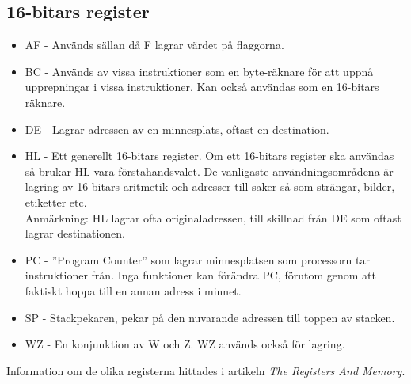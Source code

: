 \documentclass{article}
\begin{document}
\subsection{16-bitars register}
\begin{itemize}
    \item AF - Används sällan då F lagrar värdet på flaggorna.
    \item BC - Används av vissa instruktioner som en byte-räknare för att uppnå
    upprepningar i vissa instruktioner. Kan också användas som en 16-bitars
    räknare.
    \item DE - Lagrar adressen av en minnesplats, oftast en destination.
    \item HL - Ett generellt 16-bitars register. Om ett 16-bitars register ska
    användas så brukar HL vara förstahandsvalet. De vanligaste
    användningsområdena är lagring av 16-bitars aritmetik och adresser till
    saker så som strängar, bilder, etiketter etc.\\
    Anmärkning: HL lagrar ofta originaladressen, till skillnad från DE som
    oftast lagrar destinationen.
    \item PC - ''Program Counter'' som lagrar minnesplatsen som processorn tar
    instruktioner från. Inga funktioner kan förändra PC, förutom genom att
    faktiskt hoppa till en annan adress i minnet.
    \item SP - Stackpekaren, pekar på den nuvarande adressen till toppen av stacken.
    \item WZ - En konjunktion av W och Z. WZ används också för lagring.
\end{itemize}

Information om de olika registerna hittades i artikeln  \emph{The Registers And Memory}. \cite{regsandmem}

\clearpage


\clearpage
\printbibliography[heading=bibintoc]
\end{document}
